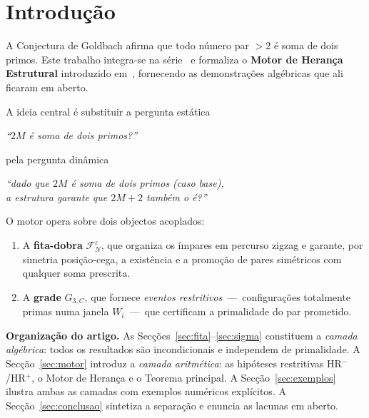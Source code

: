 \documentclass[12pt, a4paper]{article}
\theoremstyle{plain}
\theoremstyle{definition}
\theoremstyle{remark}
\begin{document}
	\tableofcontents
	
	\section{Introdução}
	
	A Conjectura de Goldbach afirma que todo número par $>2$ é soma de
	dois primos.  Este trabalho integra-se na
	série~\cite{grade,invariante,peso,problemaB} e formaliza o
	\textbf{Motor de Herança Estrutural} introduzido em~\cite{motor},
	fornecendo as demonstrações algébricas que ali ficaram em aberto.
	
	A ideia central é substituir a pergunta estática
	\begin{center}
		\emph{``$2M$ é soma de dois primos?''}
	\end{center}
	pela pergunta dinâmica
	\begin{center}
		\emph{``dado que $2M$ é soma de dois primos (caso base),\\
			a estrutura garante que $2M+2$ também o é?''}
	\end{center}
	
	O motor opera sobre dois objectos acoplados:
	\begin{enumerate}
		\item A \textbf{fita-dobra} $\mathcal{F}_N^\varepsilon$, que
		organiza os ímpares em percurso zigzag e garante, por
		simetria posição-cega, a existência e a promoção de pares
		simétricos com qualquer soma prescrita.
		\item A \textbf{grade} $G_{3,C}$, que fornece \emph{eventos
			restritivos}~---~configurações totalmente primas numa janela
		$W_i$~---~que certificam a primalidade do par prometido.
	\end{enumerate}
	
	\medskip
	\noindent\textbf{Organização do artigo.}
	As Secções~\ref{sec:fita}--\ref{sec:sigma} constituem a
	\emph{camada algébrica}: todos os resultados são incondicionais e
	independem de primalidade.
	A Secção~\ref{sec:motor} introduz a \emph{camada aritmética}: as
	hipóteses restritivas HR$^-$/HR$^+$, o Motor de Herança e o Teorema
	principal.
	A Secção~\ref{sec:exemplos} ilustra ambas as camadas com exemplos
	numéricos explícitos.
	A Secção~\ref{sec:conclusao} sintetiza a separação e enuncia as
	lacunas em aberto.
	
\end{document}
